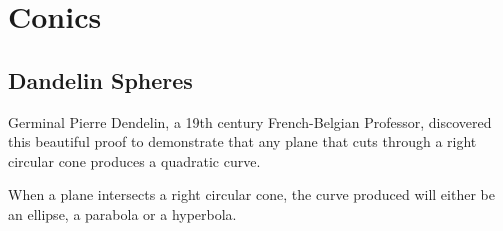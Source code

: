 \chapter{Conics}

\section{Dandelin Spheres}

Germinal Pierre Dendelin, a 19th century French-Belgian Professor, discovered this beautiful proof
to demonstrate that any plane that cuts through a right circular cone produces a quadratic curve.
\begin{theorem*}
  When a plane intersects a right circular cone, the curve produced will either be an ellipse, a parabola or a hyperbola.
\end{theorem*}

